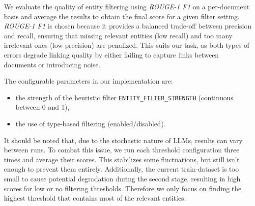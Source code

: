 We evaluate the quality of entity filtering using \textit{ROUGE-1 F1} on a per-document basis and average the results to obtain the final score for a given filter setting. \textit{ROUGE-1 F1} is chosen because it provides a balanced trade-off between precision and recall, ensuring that missing relevant entities (low recall) and too many irrelevant ones (low precision) are penalized. This suits our task, as both types of errors degrade linking quality by either failing to capture links  between documents or introducing noise.

The configurable parameters in our implementation are: 
\begin{itemize}
    \item the strength of the heuristic filter \texttt{ENTITY\_FILTER\_STRENGTH} (continuous between 0 and 1),
    \item the use of type-based filtering (enabled/disabled).
\end{itemize}

It should be noted that, due to the stochastic nature of LLMs, results can vary between runs. To combat this issue, we run each threshold configuration three times and average their scores. This stabilizes some fluctuations, but still isn't enough to prevent them entirely. Additionally, the current train-dataset is too small to cause potential degradation during the second stage, resulting in high scores for low or no filtering thresholds. Therefore we only focus on finding the highest threshold that contains most of the relevant entities.

